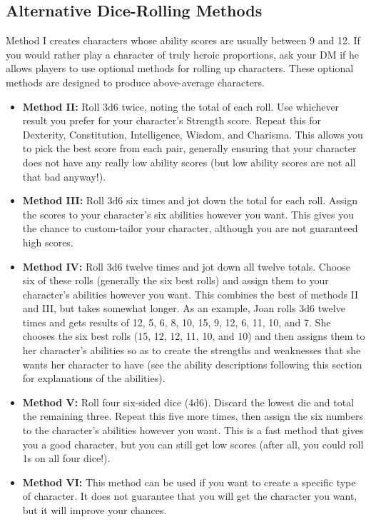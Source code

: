 \documentclass[../main.tex]{subfiles}
\begin{document}
\begin{multicols}{3}
\subsection*{Alternative Dice-Rolling Methods}
Method I creates characters whose ability scores are usually between 9 and 12. If you would rather play a character of truly heroic proportions, ask your DM if he allows players to use optional methods for rolling up characters. These optional methods are designed to produce above-average characters.
\begin{itemize}
\item \textbf{Method II:} Roll 3d6 twice, noting the total of each roll. Use whichever result you prefer for your character's Strength score. Repeat this for Dexterity, Constitution, Intelligence, Wisdom, and Charisma. This allows you to pick the best score from each pair, generally ensuring that your character does not have any really low ability scores (but low ability scores are not all that bad anyway!).
\item \textbf{Method III:} Roll 3d6 six times and jot down the total for each roll. Assign the scores to your character's six abilities however you want. This gives you the chance to custom-tailor your character, although you are not guaranteed high scores.
\item \textbf{Method IV:} Roll 3d6 twelve times and jot down all twelve totals. Choose six of these rolls (generally the six best rolls) and assign them to your character's abilities however you want. This combines the best of methods II and III, but takes somewhat longer. As an example, Joan rolls 3d6 twelve times and gets results of 12, 5, 6, 8, 10, 15, 9, 12, 6, 11, 10, and 7. She chooses the six best rolls (15, 12, 12, 11, 10, and 10) and then assigns them to her character's abilities so as to create the strengths and weaknesses that she wants her character to have (see the ability descriptions following this section for explanations of the abilities).
\item \textbf{Method V:} Roll four six-sided dice (4d6). Discard the lowest die and total the remaining three. Repeat this five more times, then assign the six numbers to the character's abilities however you want. This is a fast method that gives you a good character, but you can still get low scores (after all, you could roll 1s on all four dice!).
\item \textbf{Method VI:} This method can be used if you want to create a specific type of character. It does not guarantee that you will get the character you want, but it will improve your chances.
\end{itemize}


\end{multicols}
\end{document}
